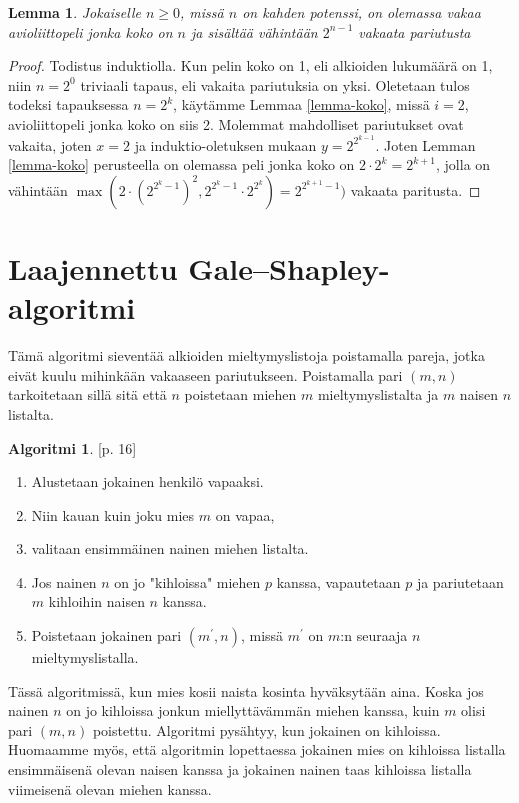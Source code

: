 \documentclass[finnish]{tktltiki2}
\newtheorem{lem}[lau]{Lemma}
\theoremstyle{definition}
\newtheorem{alg}[lau]{Algoritmi}
\theoremstyle{remark}
\begin{document}
\begin{lem}\cite[p. 24]{gusfield1989stable}
Jokaiselle $n \geq 0$, missä $n$ on kahden potenssi, on olemassa vakaa avioliittopeli jonka koko on $n$ ja sisältää vähintään $2^{n-1}$ vakaata pariutusta
\end{lem}
\begin{proof}
Todistus induktiolla. Kun pelin koko on 1, eli alkioiden lukumäärä on 1, niin $n = 2^0$ triviaali tapaus, eli vakaita pariutuksia on yksi. Oletetaan tulos todeksi tapauksessa $n = 2^k$, käytämme Lemmaa \ref{lemma-koko}, missä $i = 2$, avioliittopeli jonka koko on siis 2. Molemmat mahdolliset pariutukset ovat vakaita, joten $x = 2$ ja induktio-oletuksen mukaan $y = 2^{2^{k-1}}$. Joten Lemman \ref{lemma-koko} perusteella on olemassa peli jonka koko on $2 \cdot 2^k = 2^{k+1}$, jolla on vähintään $\max(2 \cdot (2^{2^{{k}}-1})^2, 2^{2^{k}-1} \cdot 2^{2^{k}}) = 2^{2^{k+1}-1})$ vakaata paritusta.
\end{proof}

\section{Laajennettu Gale--Shapley-algoritmi}
Tämä algoritmi sieventää alkioiden mieltymyslistoja poistamalla pareja, jotka eivät kuulu mihinkään vakaaseen pariutukseen. Poistamalla pari $(m, n)$ tarkoitetaan sillä sitä että $n$ poistetaan miehen $m$ mieltymyslistalta ja $m$ naisen $n$ listalta.

\begin{alg}\cite{gusfield1989stable}[p. 16]\label{alg2}
	\begin{enumerate}
		\item Alustetaan jokainen henkilö vapaaksi.
		\item Niin kauan kuin joku mies $m$ on vapaa,
		\item valitaan ensimmäinen nainen miehen listalta.
		\item Jos nainen $n$ on jo "kihloissa" miehen $p$ kanssa, vapautetaan $p$ ja pariutetaan $m$ kihloihin naisen $n$ kanssa.
		\item Poistetaan jokainen pari $(m^{'}, n)$, missä $m^{'}$ on $m$:n seuraaja $n$ mieltymyslistalla.
	\end{enumerate}
\end{alg}

Tässä algoritmissä, kun mies kosii naista kosinta hyväksytään aina. Koska jos nainen $n$ on jo kihloissa jonkun miellyttävämmän miehen kanssa, kuin $m$ olisi pari $(m, n)$ poistettu.
Algoritmi pysähtyy, kun jokainen on kihloissa. Huomaamme myös, että algoritmin lopettaessa jokainen mies on kihloissa listalla ensimmäisenä olevan naisen kanssa ja jokainen nainen taas kihloissa listalla viimeisenä olevan miehen kanssa.
\end{document}
